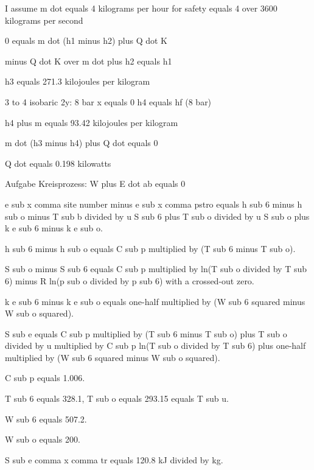 I assume m dot equals 4 kilograms per hour for safety equals 4 over 3600 kilograms per second  

0 equals m dot (h1 minus h2) plus Q dot K  

minus Q dot K over m dot plus h2 equals h1  

h3 equals 271.3 kilojoules per kilogram  

3 to 4 isobaric 2y: 8 bar x equals 0 h4 equals hf (8 bar)  

h4 plus m equals 93.42 kilojoules per kilogram  

m dot (h3 minus h4) plus Q dot equals 0  

Q dot equals 0.198 kilowatts  

Aufgabe Kreisprozess: W plus E dot ab equals 0

e sub x comma site number minus e sub x comma pstro equals h sub 6 minus h sub o minus T sub b divided by u S sub 6 plus T sub o divided by u S sub o plus k e sub 6 minus k e sub o.

h sub 6 minus h sub o equals C sub p multiplied by (T sub 6 minus T sub o).

S sub o minus S sub 6 equals C sub p multiplied by ln(T sub o divided by T sub 6) minus R ln(p sub o divided by p sub 6) with a crossed-out zero.

k e sub 6 minus k e sub o equals one-half multiplied by (W sub 6 squared minus W sub o squared).

S sub e equals C sub p multiplied by (T sub 6 minus T sub o) plus T sub o divided by u multiplied by C sub p ln(T sub o divided by T sub 6) plus one-half multiplied by (W sub 6 squared minus W sub o squared).

C sub p equals 1.006.

T sub 6 equals 328.1, T sub o equals 293.15 equals T sub u.

W sub 6 equals 507.2.

W sub o equals 200.

S sub e comma x comma tr equals 120.8 kJ divided by kg.